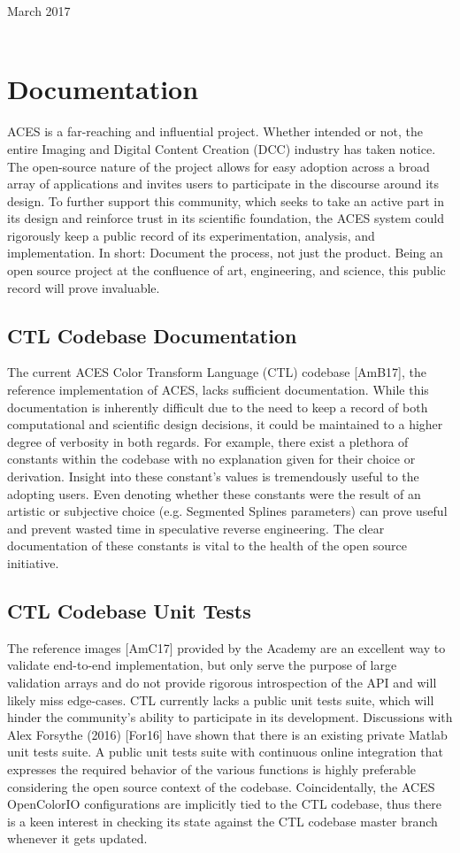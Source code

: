 \documentclass[conference]{IEEEtran}
\begin{document}
\hfill March 2017
\\
\\

\section{Documentation}
ACES is a far-reaching and influential project. Whether intended or not, the entire Imaging and Digital Content Creation (DCC) industry has taken notice. The open-source nature of the project allows for easy adoption across a broad array of applications and invites users to participate in the discourse around its design. To further support this community, which seeks to take an active part in its design and reinforce trust in its scientific foundation, the ACES system could rigorously keep a public record of its experimentation, analysis, and implementation. In short: Document the process, not just the product. Being an open source project at the confluence of art, engineering, and science, this public record will prove invaluable.

\subsection{CTL Codebase Documentation}
The current ACES Color Transform Language (CTL) codebase [AmB17], the reference implementation of ACES, lacks sufficient documentation. While this documentation is inherently difficult due to the need to keep a record of both computational and scientific design decisions, it could be maintained to a higher degree of verbosity in both regards. For example, there exist a plethora of constants within the codebase with no explanation given for their choice or derivation. Insight into these constant's values is tremendously useful to the adopting users. Even denoting whether these constants were the result of an artistic or subjective choice (e.g. Segmented Splines parameters) can prove useful and prevent wasted time in speculative reverse engineering. The clear documentation of these constants is vital to the health of the open source initiative.

\subsection{CTL Codebase Unit Tests}
The reference images [AmC17] provided by the Academy are an excellent way to validate end-to-end implementation, but only serve the purpose of large validation arrays and do not provide rigorous introspection of the API and will likely miss edge-cases. CTL currently lacks a public unit tests suite, which will hinder the community's ability to participate in its development. Discussions with Alex Forsythe (2016) [For16] have shown that there is an existing private Matlab unit tests suite. A public unit tests suite with continuous online integration that expresses the required behavior of the various functions is highly preferable considering the open source context of the codebase. Coincidentally, the ACES OpenColorIO configurations are implicitly tied to the CTL codebase, thus there is a keen interest in checking its state against the CTL codebase master branch whenever it gets updated.
\end{document}

